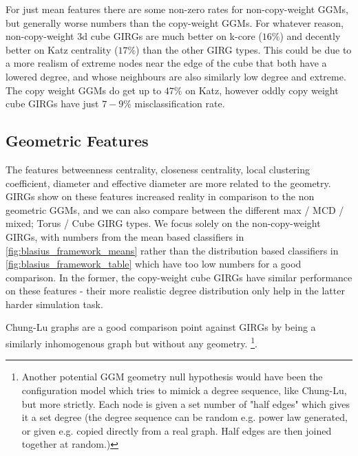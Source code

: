 For just mean features there are some non-zero rates for non-copy-weight GGMs, but generally worse numbers than the copy-weight GGMs. For whatever reason, non-copy-weight 3d cube GIRGs are much better on k-core ($16\%$) and decently better on Katz centrality ($17\%$) than the other GIRG types. This could be due to a more realism of extreme nodes near the edge of the cube that both have a lowered degree, and whose neighbours are also similarly low degree and extreme. The copy weight GGMs do get up to $47\%$ on Katz, however oddly copy weight cube GIRGs have just $7-9\%$ misclassification rate.

\subsection{Geometric Features}
The features betweenness centrality, closeness centrality, local clustering coefficient, diameter and effective diameter are more related to the geometry. GIRGs show on these features increased reality in comparison to the non geometric GGMs, and we can also compare between the different max / MCD / mixed; Torus / Cube GIRG types. We focus solely on the non-copy-weight GIRGs, with numbers from the mean based classifiers in \cref{fig:blasius_framework_means} rather than the distribution based classifiers in \cref{fig:blasius_framework_table} which have too low numbers for a good comparison. In the former, the copy-weight cube GIRGs have similar performance on these features - their more realistic degree distribution only help in the latter harder simulation task.


Chung-Lu graphs are a good comparison point against GIRGs by being a similarly inhomogenous graph but without any geometry.
\footnote{Another potential GGM geometry null hypothesis would have been the configuration model which tries to mimick a degree sequence, like Chung-Lu, but more strictly. Each node is given a set number of "half edges" which gives it a set degree (the degree sequence can be random e.g. power law generated, or given e.g. copied directly from a real graph. Half edges are then joined together at random.)}.



